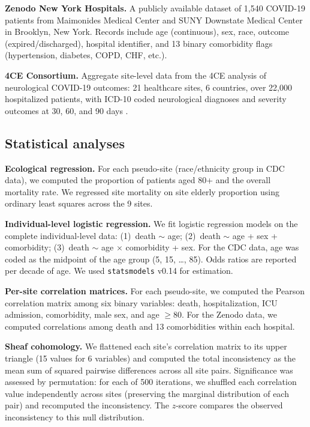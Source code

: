 \documentclass{article}
\begin{document}
\textbf{Zenodo New York Hospitals.}  A publicly available dataset of 1,540
COVID-19 patients from Maimonides Medical Center and SUNY Downstate Medical
Center in Brooklyn, New York.  Records include age (continuous), sex,
race, outcome (expired/discharged), hospital identifier, and 13 binary
comorbidity flags (hypertension, diabetes, COPD, CHF, etc.).

\textbf{4CE Consortium.}  Aggregate site-level data from the 4CE analysis
of neurological COVID-19 outcomes: 21 healthcare sites, 6 countries, over
22,000 hospitalized patients, with ICD-10 coded neurological diagnoses and
severity outcomes at 30, 60, and 90 days \cite{four_ce_neuro2021}.

\subsection{Statistical analyses}

\textbf{Ecological regression.}  For each pseudo-site (race/ethnicity group
in CDC data), we computed the proportion of patients aged 80+ and the overall
mortality rate.  We regressed site mortality on site elderly proportion using
ordinary least squares across the 9 sites.

\textbf{Individual-level logistic regression.}  We fit logistic regression
models on the complete individual-level data: (1)~death $\sim$ age; (2)~death
$\sim$ age + sex + comorbidity; (3)~death $\sim$ age $\times$ comorbidity +
sex.  For the CDC data, age was coded as the midpoint of the age group (5, 15,
\ldots, 85).  Odds ratios are reported per decade of age.  We used
\texttt{statsmodels} v0.14 for estimation.

\textbf{Per-site correlation matrices.}  For each pseudo-site, we computed the
Pearson correlation matrix among six binary variables: death, hospitalization,
ICU admission, comorbidity, male sex, and age $\geq 80$.  For the Zenodo data,
we computed correlations among death and 13 comorbidities within each hospital.

\textbf{Sheaf cohomology.}  We flattened each site's correlation matrix to its
upper triangle (15 values for 6 variables) and computed the total
inconsistency as the mean sum of squared pairwise differences across all site
pairs.  Significance was assessed by permutation: for each of 500 iterations,
we shuffled each correlation value independently across sites (preserving the
marginal distribution of each pair) and recomputed the inconsistency.  The
$z$-score compares the observed inconsistency to this null distribution.
\end{document}
